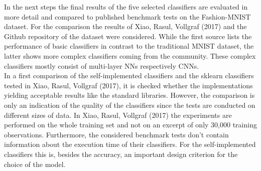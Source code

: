 \documentclass[11pt,a4paper]{article}
\begin{document}
\noindent In the next steps the final results of the five selected classifiers are evaluated in more detail and compared to published benchmark tests on the Fashion-MNIST dataset. For the comparison the results of Xiao, Rasul, Vollgraf (2017) and the Github repository of the dataset were considered.\cite{xiao2017/online} \cite{web:fashion_mnist_benchmarks} While the first source lists the performance of basic classifiers in contrast to the traditional MNIST dataset, the latter shows more complex classifiers coming from the community. These complex classifiers mostly consist of multi-layer NNs respectively CNNs.\\

\noindent In a first comparison of the self-implemented classifiers and the sklearn classifiers tested in Xiao, Rasul, Vollgraf (2017), it is checked whether the implementations yielding acceptable results like the standard libraries. However, the comparison is only an indication of the quality of the classifiers since the tests are conducted on different sizes of data. In Xiao, Rasul, Vollgraf (2017) the experiments are performed on the whole training set and not on an excerpt of only 30,000 training observations. Furthermore, the considered benchmark tests don't contain information about the execution time of their classifiers. For the self-implemented classifiers this is, besides the accuracy, an important design criterion for the choice of the model.\\
\end{document}
